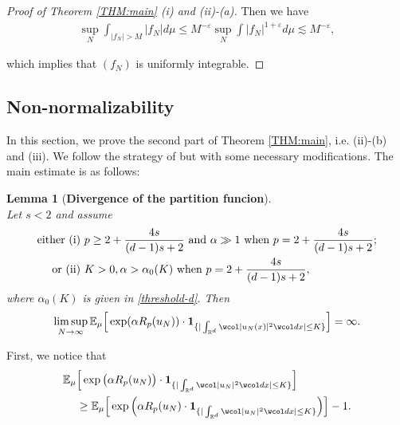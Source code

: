 \documentclass[%
11pt,  reqno]{amsart}
\newtheorem{lemma}[theorem]{Lemma}
\theoremstyle{remarkstyle}
\newcommand{\1}{\hspace{0.2mm}\text{I}\hspace{0.2mm}}
\newcommand{\noi}{\noindent}
\newcommand{\R}{\mathbb{R}}
\newcommand{\E}{\mathbb{E}}
\newcommand{\al}{\alpha}
\newcommand{\eps}{\varepsilon}
\newcommand{\wick}[1]{\wcol#1\wcol}
\newcommand{\les}{\lesssim}
\newcommand{\ind}{\mathbf 1}
\numberwithin{equation}{section}
\numberwithin{theorem}{section}
\begin{document}
\begin{proof}[Proof of Theorem \ref{THM:main} (i) and (ii)-(a)]
		\noi 
		Then we have 
		\begin{align}
			\label{uni_cri}
			\sup_N \int_{|f_N| > M} |f_N| d\mu \le M^{-\eps}   \sup_N \int |f_N|^{1+\eps} d\mu \les M^{-\eps},
		\end{align}
		
		\noi 
		which implies that $(f_N)$ is uniformly integrable.
	\end{proof}
	
	
	\subsection{Non-normalizability}
	\label{SEC:non}
	
	In this section, we prove the second part of Theorem \ref{THM:main}, i.e. (ii)-(b) and (iii). We follow the strategy of \cite{RSTW22} but with some necessary modifications. The main estimate is as follows: 
	\begin{lemma}[\textbf{Divergence of the partition funcion}]\label{lem:div}\mbox{}\\
		Let $s<2$ and assume 
		\begin{align}
			\label{condition2}
			\begin{split}
				\textup{either (i) }& p \ge 2+\frac{4s}{(d-1)s+2} \textup{ and } \alpha \gg 1 \textup{ when } p=2+\frac{4s}{(d-1)s+2}; \\
				\textup{or   (ii) } & K > 0, \al > \al_0 (K) \textup{ when } p=2+\frac{4s}{(d-1)s+2},
			\end{split}
		\end{align}
		where $\al_0(K)$ is given in \eqref{threshold-d}. Then
		\begin{align}
			\limsup_{N\to \infty}  \E_{\mu}  \Big[ \exp (\al R_p(u_N)) \cdot  \ind_{\{ | \int_{\R^d} \wick{|u_N (x)|^2} dx| \le K\}}\Big] =  \infty.
			\label{pax}
		\end{align}
	\end{lemma}
	
	First, we notice that 
	\begin{align}
		\begin{split}
			\E_\mu &\Big[  \exp\big( \al R_p(u_N)\big) 
			\cdot\ind_{\{ |\int_{{\R^d}}  \wick{ |u_N|^2 } dx | \le K\}} \Big]\\
			&\ge \E_\mu\Big[\exp\Big(  \al R_p(u_N)
			\cdot \ind_{\{ |\int_{{\R^d}} \wick{ |u_N|^2 } dx | \le K\}}\Big)   \Big]
			- 1.
		\end{split}
		\label{pax1}
	\end{align}
	
\end{document}
